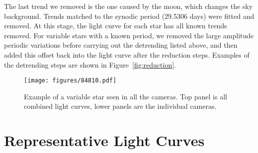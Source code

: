 \documentclass{aa}
\begin{document}
The last trend we removed is the one caused by the moon, which changes the sky background.
%
Trends matched to the synodic period (29.5306 days) were fitted and removed.
%
At this stage, the light curve for each star has all known trends removed.
%
For variable stars with a known period, we removed the large amplitude periodic variations before carrying out the detrending listed above, and then added this offset back into the light curve after the reduction steps.
%
Examples of the detrending steps are shown in Figure~\ref{fig:reduction}.

\begin{figure*}
    \centering
    \texttt{[image: figures/84810.pdf]}
    \caption{Example of a variable star seen in all the cameras.
    Top panel is all combined light curves, lower panels are the individual cameras.}
    \label{fig:cleaned_output}
\end{figure*}

\section{Representative Light Curves}
\label{sec:results}









\end{document}

